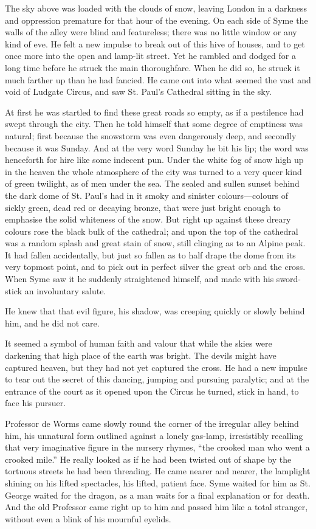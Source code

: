 The sky above was loaded with the clouds of snow, leaving London in a darkness and oppression premature for that hour of the evening. On each side of Syme the walls of the alley were blind and featureless; there was no little window or any kind of eve. He felt a new impulse to break out of this hive of houses, and to get once more into the open and lamp-lit street. Yet he rambled and dodged for a long time before he struck the main thoroughfare. When he did so, he struck it much farther up than he had fancied. He came out into what seemed the vast and void of Ludgate Circus, and saw St. Paul’s Cathedral sitting in the sky.

At first he was startled to find these great roads so empty, as if a pestilence had swept through the city. Then he told himself that some degree of emptiness was natural; first because the snowstorm was even dangerously deep, and secondly because it was Sunday. And at the very word Sunday he bit his lip; the word was henceforth for hire like some indecent pun. Under the white fog of snow high up in the heaven the whole atmosphere of the city was turned to a very queer kind of green twilight, as of men under the sea. The sealed and sullen sunset behind the dark dome of St. Paul’s had in it smoky and sinister colours⁠—colours of sickly green, dead red or decaying bronze, that were just bright enough to emphasise the solid whiteness of the snow. But right up against these dreary colours rose the black bulk of the cathedral; and upon the top of the cathedral was a random splash and great stain of snow, still clinging as to an Alpine peak. It had fallen accidentally, but just so fallen as to half drape the dome from its very topmost point, and to pick out in perfect silver the great orb and the cross. When Syme saw it he suddenly straightened himself, and made with his sword-stick an involuntary salute.

He knew that that evil figure, his shadow, was creeping quickly or slowly behind him, and he did not care.

It seemed a symbol of human faith and valour that while the skies were darkening that high place of the earth was bright. The devils might have captured heaven, but they had not yet captured the cross. He had a new impulse to tear out the secret of this dancing, jumping and pursuing paralytic; and at the entrance of the court as it opened upon the Circus he turned, stick in hand, to face his pursuer.

Professor de Worms came slowly round the corner of the irregular alley behind him, his unnatural form outlined against a lonely gas-lamp, irresistibly recalling that very imaginative figure in the nursery rhymes, “the crooked man who went a crooked mile.” He really looked as if he had been twisted out of shape by the tortuous streets he had been threading. He came nearer and nearer, the lamplight shining on his lifted spectacles, his lifted, patient face. Syme waited for him as St. George waited for the dragon, as a man waits for a final explanation or for death. And the old Professor came right up to him and passed him like a total stranger, without even a blink of his mournful eyelids.

